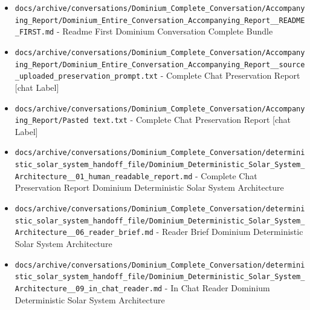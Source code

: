 \documentclass[10.5pt,a4paper,openany]{book}
\begin{document}
\begin{itemize}
\item \texttt{docs/\allowbreak{}archive/\allowbreak{}conversations/\allowbreak{}Dominium\_\allowbreak{}Complete\_\allowbreak{}Conversation/\allowbreak{}Accompanying\_\allowbreak{}Report/\allowbreak{}Dominium\_\allowbreak{}Entire\_\allowbreak{}Conversation\_\allowbreak{}Accompanying\_\allowbreak{}Report\_\allowbreak{}\_\allowbreak{}README\_\allowbreak{}FIRST.\allowbreak{}md} -\allowbreak{} Readme First Dominium Conversation Complete Bundle
\item \texttt{docs/\allowbreak{}archive/\allowbreak{}conversations/\allowbreak{}Dominium\_\allowbreak{}Complete\_\allowbreak{}Conversation/\allowbreak{}Accompanying\_\allowbreak{}Report/\allowbreak{}Dominium\_\allowbreak{}Entire\_\allowbreak{}Conversation\_\allowbreak{}Accompanying\_\allowbreak{}Report\_\allowbreak{}\_\allowbreak{}source\_\allowbreak{}uploaded\_\allowbreak{}preservation\_\allowbreak{}prompt.\allowbreak{}txt} -\allowbreak{} Complete Chat Preservation Report [chat Label]
\item \texttt{docs/\allowbreak{}archive/\allowbreak{}conversations/\allowbreak{}Dominium\_\allowbreak{}Complete\_\allowbreak{}Conversation/\allowbreak{}Accompanying\_\allowbreak{}Report/\allowbreak{}Pasted text.\allowbreak{}txt} -\allowbreak{} Complete Chat Preservation Report [chat Label]
\item \texttt{docs/\allowbreak{}archive/\allowbreak{}conversations/\allowbreak{}Dominium\_\allowbreak{}Complete\_\allowbreak{}Conversation/\allowbreak{}deterministic\_\allowbreak{}solar\_\allowbreak{}system\_\allowbreak{}handoff\_\allowbreak{}file/\allowbreak{}Dominium\_\allowbreak{}Deterministic\_\allowbreak{}Solar\_\allowbreak{}System\_\allowbreak{}Architecture\_\allowbreak{}\_\allowbreak{}01\_\allowbreak{}human\_\allowbreak{}readable\_\allowbreak{}report.\allowbreak{}md} -\allowbreak{} Complete Chat Preservation Report Dominium Deterministic Solar System Architecture
\item \texttt{docs/\allowbreak{}archive/\allowbreak{}conversations/\allowbreak{}Dominium\_\allowbreak{}Complete\_\allowbreak{}Conversation/\allowbreak{}deterministic\_\allowbreak{}solar\_\allowbreak{}system\_\allowbreak{}handoff\_\allowbreak{}file/\allowbreak{}Dominium\_\allowbreak{}Deterministic\_\allowbreak{}Solar\_\allowbreak{}System\_\allowbreak{}Architecture\_\allowbreak{}\_\allowbreak{}06\_\allowbreak{}reader\_\allowbreak{}brief.\allowbreak{}md} -\allowbreak{} Reader Brief Dominium Deterministic Solar System Architecture
\item \texttt{docs/\allowbreak{}archive/\allowbreak{}conversations/\allowbreak{}Dominium\_\allowbreak{}Complete\_\allowbreak{}Conversation/\allowbreak{}deterministic\_\allowbreak{}solar\_\allowbreak{}system\_\allowbreak{}handoff\_\allowbreak{}file/\allowbreak{}Dominium\_\allowbreak{}Deterministic\_\allowbreak{}Solar\_\allowbreak{}System\_\allowbreak{}Architecture\_\allowbreak{}\_\allowbreak{}09\_\allowbreak{}in\_\allowbreak{}chat\_\allowbreak{}reader.\allowbreak{}md} -\allowbreak{} In Chat Reader Dominium Deterministic Solar System Architecture

\end{itemize}
\end{document}
